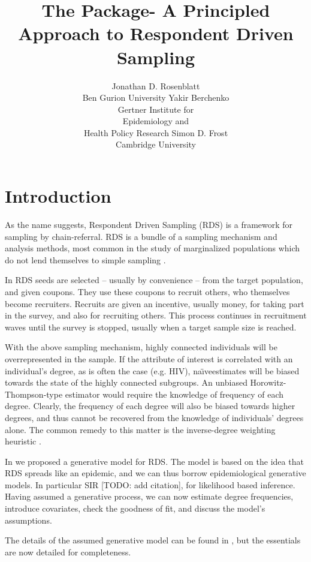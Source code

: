 \documentclass[article]{jss}
\author{Jonathan D. Rosenblatt\\Ben Gurion University \And 
        Yakir Berchenko\\ Gertner Institute for \\ Epidemiology and \\ Health Policy Research \And
        Simon D. Frost\\ Cambridge University}
\title{The \pkg{chords} \proglang{R} Package- A Principled Approach to Respondent Driven Sampling}
\newcommand{\naive}{na\"{\i}ve}
\begin{document}

\section{Introduction}

As the name suggests, Respondent Driven Sampling (RDS) is a framework for sampling by chain-referral.
RDS is a bundle of a sampling mechanism and analysis methods, most common in the study of marginalized populations which do not lend themselves to simple sampling \citep{heckathorn_respondent-driven_1997,heckathorn_respondent-driven_2002}. 

In RDS seeds are selected -- usually by convenience -- from the target population, and given coupons. 
They use these coupons to recruit others, who themselves become recruiters. 
Recruits are given an incentive, usually money, for taking part in the survey, and also for recruiting others.
This process continues in recruitment waves until the survey is stopped, usually when a target sample size is reached.

With the above sampling mechanism, highly connected individuals will be overrepresented in the sample.
If the attribute of interest is correlated with an individual's degree, as is often the case (e.g. HIV), \naive estimates will be biased towards the state of the highly connected subgroups.
An unbiased Horowitz-Thompson-type estimator \citep{horvitz_generalization_1952} would require the knowledge of frequency of each degree. 
Clearly, the frequency of each degree will also be biased towards higher degrees, and thus cannot be recovered from the knowledge of individuals' degrees alone. 
The common remedy to this matter is the inverse-degree weighting heuristic \citep{crawford2015hidden,guntuboyina2012impossibility}.

In \cite{berchenko_modeling_2013} we proposed a generative model for RDS.
The model is based on the idea that RDS spreads like an epidemic, and we can thus borrow epidemiological generative models. In particular SIR [TODO: add citation], for likelihood based inference.
Having assumed a generative process, we can now estimate degree frequencies, introduce covariates, check the goodness of fit, and discuss the model's assumptions. 

The details of the assumed generative model can be found in \cite{berchenko_modeling_2013}, but the essentials are now detailed for completeness.
\end{document}
